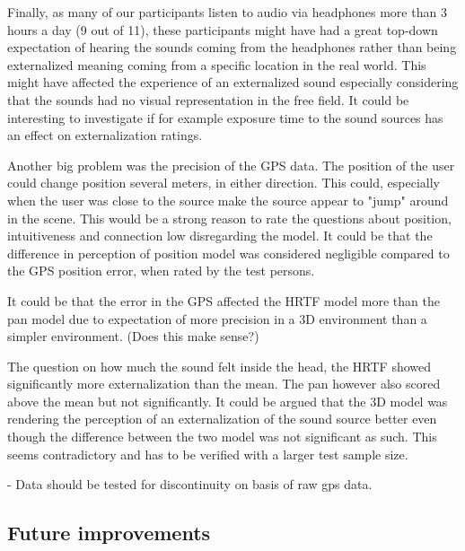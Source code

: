 \documentclass[journal]{IEEEtran}
\begin{document}
Finally, as many of our participants listen to audio via headphones more than 3 hours a day (9 out of 11), these participants might have had a great top-down expectation of hearing the sounds coming from the headphones rather than being externalized meaning coming from a specific location in the real world. This might have affected the experience of an externalized sound especially considering that the sounds had no visual representation in the free field. It could be interesting to investigate if for example exposure time to the sound sources has an effect on externalization ratings. 

Another big problem was the precision of the GPS data. The position of the user could change position several meters, in either direction. This could, especially when the user was close to the source make the source appear to "jump" around in the scene. This would be a strong reason to rate the questions about position, intuitiveness and connection low disregarding the model. It could be that the difference in perception of position model was considered negligible compared to the GPS position error, when rated by the test persons. 

It could be that the error in the GPS affected the HRTF model more than the pan model due to expectation of more precision in a 3D environment than a simpler environment. (Does this make sense?)

 The question on how much the sound felt inside the head, the HRTF showed significantly more externalization than the mean. The pan however also scored above the mean but not significantly. It could be argued that the 3D model was rendering the perception of an externalization of the sound source better even though the difference between the two model was not significant as such. This seems contradictory and has to be verified with a larger test sample size.
 
 - Data should be tested for discontinuity on basis of raw gps data.
\subsection{Future improvements}


%
%
\end{document}
